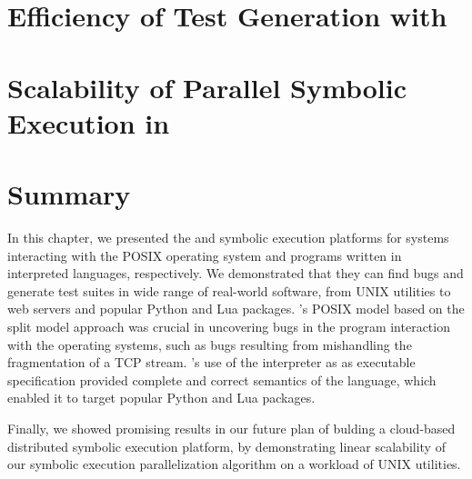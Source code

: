 \section{Efficiency of Test Generation with \chef}
\label{sec:eval:chef-efficiency}


\section{Scalability of Parallel Symbolic Execution in \cnine}
\label{sec:eval:cnine-efficiency}


\section{Summary}

In this chapter, we presented the \cnine and \chef symbolic execution platforms for systems interacting with the POSIX operating system and programs written in interpreted languages, respectively.
%
We demonstrated that they can find bugs and generate test suites in wide range of real-world software, from UNIX utilities to web servers and popular Python and Lua packages.
%
\cnine's POSIX model based on the split model approach was crucial in uncovering bugs in the program interaction with the operating systems, such as bugs resulting from mishandling the fragmentation of a TCP stream.
%
\chef's use of the interpreter as as executable specification provided complete and correct semantics of the language, which enabled it to target popular Python and Lua packages.

Finally, we showed promising results in our future plan of bulding a cloud-based distributed symbolic execution platform, by demonstrating linear scalability of our symbolic execution parallelization algorithm on a workload of UNIX utilities.


